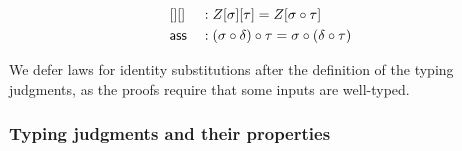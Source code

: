 \begin{lemma}
\begin{alignat*}{5}
  & [][] && : Z[\sigma][\tau] = Z[\sigma\circ\tau]
  \\
  & \mathsf{ass} && : (\sigma\circ \delta)\circ\tau = \sigma\circ (\delta\circ\tau)
\end{alignat*}
\end{lemma}

We defer laws for identity substitutions after the definition of the typing
judgments, as the proofs require that some inputs are well-typed.



\subsubsection{Typing judgments and their properties}

